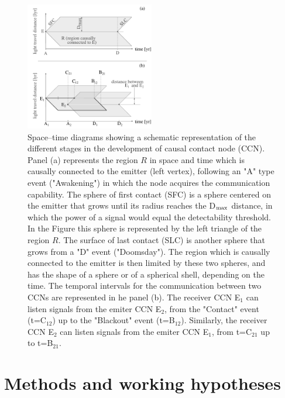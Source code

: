 \documentclass[crop]{CSLB}
\newcommand{\ceti}{CCN}
\newcommand{\cetis}{CCNs}
\begin{document}
\begin{figure}[!t]
   \centering
   \includegraphics[width=0.5\textwidth]{F_scheme.pdf}
   \caption{
Space--time diagrams showing a schematic representation of the
different stages in the development of causal contact node (\ceti{}).
%
Panel (a) represents the region $R$ in space and time which is causally
connected to the emitter (left vertex), following an "A" type event
("Awakening") in which the node acquires the communication capability.
%
The sphere of first contact (SFC) is a sphere centered on the emitter
that grows until its radius reaches the D$_{\rm max}$ distance, in which
the power of a signal would equal the detectability threshold.
%
In the Figure this sphere is represented by the left triangle of the
region $R$.
%
The surface of last contact (SLC) is another sphere that grows from a
"D" event ("Doomsday").
%
The region which is causally connected to the emitter is then limited
by these two spheres, and has the shape of a sphere or of a spherical
shell, depending on the time.
%
The temporal intervals for
the communication between two \cetis{} are represented in he
panel (b).
%
The receiver \ceti{} E$_1$ can listen signals from the emiter \ceti{} E$_2$,
from the "Contact" event (t=C$_{12}$) up to the "Blackout" event (t=B$_{12}$).
%
Similarly, 
the receiver \ceti{} E$_2$ can listen signals from the emiter \ceti{} E$_1$,
from t=C$_{21}$ up to t=B$_{21}$. 
%
   } \label{F_scheme}
\end{figure}

 




\section{Methods and working hypotheses}\label{S_methods}
\end{document}
